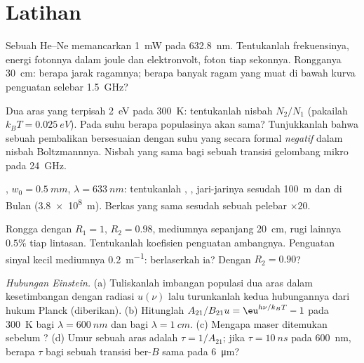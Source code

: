 \section{Latihan}

\begin{exercise}[$\star$]\label{exo:b2:laser:1}
Sebuah  He--Ne memancarkan \qty{1}{mW} pada \qty{632.8}{nm}. Tentukanlah frekuensinya, energi
fotonnya dalam joule dan elektronvolt, foton tiap sekonnya. Rongganya
\qty{30}{cm}: berapa jarak ragamnya; berapa banyak ragam yang muat di bawah kurva penguatan
selebar \qty{1.5}{GHz}?
\end{exercise}

\begin{exercise}[$\star$]\label{exo:b2:laser:2}
Dua aras yang terpisah \qty{2}{eV} pada \qty{300}{K}: tentukanlah nisbah $N_2/N_1$ (pakailah
$k_BT = \qty{0.025}{eV}$). Pada suhu berapa populasinya akan
sama? Tunjukkanlah bahwa sebuah pembalikan bersesuaian dengan suhu yang secara formal
\emph{negatif} dalam nisbah Boltzmannnya. Nisbah yang sama bagi sebuah transisi gelombang
mikro pada \qty{24}{GHz}.
\end{exercise}

\begin{exercise}[$\star$]\label{exo:b2:laser:3}
, $w_0 = \qty{0.5}{mm}$, $\lambda = \qty{633}{nm}$: tentukanlah , , jari-jarinya sesudah \qty{100}{m} dan di Bulan
(\qty{3.8e8}{m}). Berkas yang sama sesudah sebuah pelebar $\times 20$.
\end{exercise}

\begin{exercise}[$\star$]\label{exo:b2:laser:4}
Rongga dengan $R_1 = 1$, $R_2 = 0.98$, mediumnya sepanjang \qty{20}{cm}, rugi
lainnya $0.5\%$ tiap lintasan. Tentukanlah koefisien penguatan ambangnya. Penguatan sinyal
kecil mediumnya \qty{0.2}{m^{-1}}: berlaserkah ia? Dengan
$R_2 = 0.90$?
\end{exercise}

\begin{exercise}[$\star\star$]\label{exo:b2:laser:5}
\emph{Hubungan Einstein.} (a) Tuliskanlah imbangan populasi dua aras
dalam kesetimbangan dengan radiasi $u(\nu)$ lalu turunkanlah kedua
hubungannya dari hukum Planck (diberikan). (b) Hitunglah
$A_{21}/B_{21}u = \eu^{h\nu/k_BT} - 1$ pada \qty{300}{K} bagi
$\lambda = \qty{600}{nm}$ dan bagi $\lambda = \qty{1}{cm}$. (c) Mengapa
maser ditemukan sebelum ? (d) Umur sebuah aras adalah
$\tau = 1/A_{21}$; jika $\tau = \qty{10}{ns}$ pada \qty{600}{nm}, berapa
$\tau$ bagi sebuah transisi ber-$B$ sama pada \qty{6}{\micro m}?
\end{exercise}

